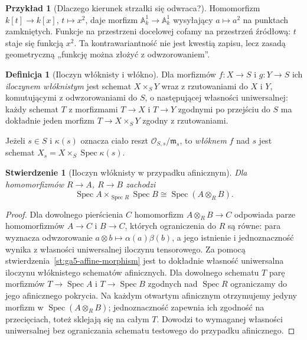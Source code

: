 \documentclass[11pt,a4paper,openany]{report}
\numberwithin{equation}{section}
\theoremstyle{plain}
\newtheorem{stwierdzenie}[twierdzenie]{Stwierdzenie}
\theoremstyle{definition}
\newtheorem{definicja}[twierdzenie]{Definicja}
\newtheorem{przyklad}[twierdzenie]{Przykład}
\theoremstyle{remark}
\newcommand{\A}{\mathbb A}
\newcommand{\Spec}{\operatorname{Spec}}
\begin{document}
\begin{przyklad}[Dlaczego kierunek strzałki się odwraca?]
Homomorfizm $k[t]\to k[x]$, $t\mapsto x^2$, daje morfizm
$\A^1_k\to\A^1_k$ wysyłający $a\mapsto a^2$ na punktach
zamkniętych. Funkcje na przestrzeni docelowej cofamy na przestrzeń
źródłową: $t$ staje się funkcją $x^2$.
Ta kontrawariantność nie jest kwestią zapisu, lecz zasadą
geometryczną „funkcję można złożyć z odwzorowaniem”.
\end{przyklad}

\begin{definicja}[Iloczyn włóknisty i włókno]
\label{def:ga5-fibreproduct}
Dla morfizmów $f:X\to S$ i $g:Y\to S$ ich \emph{iloczynem
włóknistym} jest schemat $X\times_S Y$ wraz z rzutowaniami do $X$
i $Y$, komutującymi z odwzorowaniami do $S$, o następującej
własności uniwersalnej: każdy schemat $T$ z morfizmami $T\to X$
i $T\to Y$ zgodnymi po przejściu do $S$ ma dokładnie jeden
morfizm $T\to X\times_S Y$ zgodny z rzutowaniami.

Jeżeli $s\in S$ i $\kappa(s)$ oznacza ciało reszt
$\mathcal O_{S,s}/\mathfrak m_s$, to \emph{włóknem} $f$ nad $s$
jest schemat $X_s=X\times_S\Spec\kappa(s)$.
\end{definicja}

\begin{stwierdzenie}[Iloczyn włóknisty w przypadku afinicznym]
\label{st:ga5-tensor-fibre}
Dla homomorfizmów $R\to A$, $R\to B$ zachodzi
\[
 \Spec A\times_{\Spec R}\Spec B\cong\Spec(A\otimes_R B).
\]
\end{stwierdzenie}
\begin{proof}
Dla dowolnego pierścienia $C$ homomorfizm
$A\otimes_R B\to C$ odpowiada parze homomorfizmów
$A\to C$ i $B\to C$, których ograniczenia do $R$ są równe:
para wyznacza odwzorowanie $a\otimes b\mapsto\alpha(a)\beta(b)$,
a jego istnienie i jednoznaczność wynika z własności uniwersalnej
iloczynu tensorowego. Za pomocą stwierdzenia~\ref{st:ga5-affine-morphism}
jest to dokładnie własność uniwersalna iloczynu włóknistego
schematów afinicznych. Dla dowolnego schematu $T$ parę
morfizmów $T\to\Spec A$ i $T\to\Spec B$ zgodnych nad
$\Spec R$ ograniczamy do jego afinicznego pokrycia.
Na każdym otwartym afinicznym otrzymujemy jedyny morfizm
w $\Spec(A\otimes_R B)$; jednoznaczność zapewnia ich
zgodność na przecięciach, toteż sklejają się na całym $T$.
Dowodzi to wymaganej własności uniwersalnej bez
ograniczania schematu testowego do przypadku afinicznego.
\end{proof}
\end{document}
